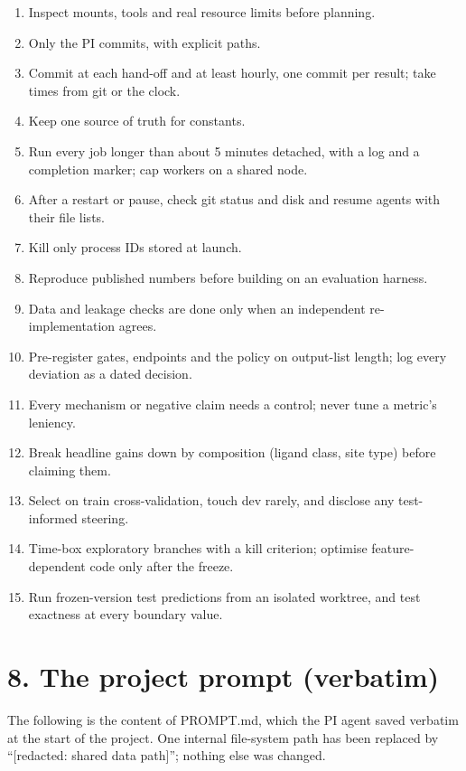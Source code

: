 \documentclass[10pt,letterpaper]{article}
\begin{document}
\begin{enumerate}
\item Inspect mounts, tools and real resource limits before planning.
\item Only the PI commits, with explicit paths.
\item Commit at each hand-off and at least hourly, one commit per result; take times from git or the clock.
\item Keep one source of truth for constants.
\item Run every job longer than about 5 minutes detached, with a log and a completion marker; cap workers on a shared node.
\item After a restart or pause, check git status and disk and resume agents with their file lists.
\item Kill only process IDs stored at launch.
\item Reproduce published numbers before building on an evaluation harness.
\item Data and leakage checks are done only when an independent re-implementation agrees.
\item Pre-register gates, endpoints and the policy on output-list length; log every deviation as a dated decision.
\item Every mechanism or negative claim needs a control; never tune a metric's leniency.
\item Break headline gains down by composition (ligand class, site type) before claiming them.
\item Select on train cross-validation, touch dev rarely, and disclose any test-informed steering.
\item Time-box exploratory branches with a kill criterion; optimise feature-dependent code only after the freeze.
\item Run frozen-version test predictions from an isolated worktree, and test exactness at every boundary value.
\end{enumerate}

\section*{8. The project prompt (verbatim)}

The following is the content of PROMPT.md, which the PI agent saved verbatim at the start of the project. One internal file-system path has been replaced by ``[redacted: shared data path]''; nothing else was changed.
\end{document}
